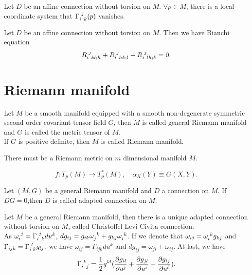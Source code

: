 \begin{newthem}
Let $D$ be an affine connection without torsion on $M$. $\forall p \in M$, there is a local coordinate system that $\tensor{\Gamma}{_i^j_k}(p)$ vanishes.
\end{newthem}

\begin{newthem}
Let $D$ be an affine connection without torsion on $M$. Then we have Bianchi equation
\[\tensor{R}{_i^j_{kl;h}} +  \tensor{R}{_i^j_{hk;l}} + \tensor{R}{_i^j_{lh;k}} = 0.\]
\end{newthem}

\section{Riemann manifold}
\begin{newdef} 
Let $M$ be a smooth manifold equipped with a smooth non-degenerate symmetric second order covariant tensor field $G$, then $M$ is called general Riemann manifold and $G$ is called the metric tensor of $M$.\\
If $G$ is positive definite, then $M$ is called Riemann manifold.
\end{newdef}

\vspace{15pt}

\begin{newthem}
There must be a Riemann metric on $m$ dimensional manifold $M$.
\end{newthem}

\vspace{15pt}

\begin{newdef}
\[f:T_p(M) \to T^*_p(M) , \quad \alpha_X(Y) \equiv G(X,Y).\]
\end{newdef}

\vspace{15pt}

\begin{newdef}
Let $(M,G)$ be a general Riemann manifold and $D$ a connection on $M$. If $DG=0$,then $D$ is called adapted connection on $M$.
\end{newdef}

\vspace{15pt}

\begin{newprop} 
Let $M$ be a general Riemann manifold, then there is a unique adapted connection without torsion on $M$, called Christoffel-Levi-Civita connection. \\
As $\tensor{\omega}{_i^j} = \tensor{\Gamma}{_i^j_k} du^k$, $dg_{ij} = g_{ik} \tensor{\omega}{_j^k}   + g_{kj}\tensor{\omega}{_i^k}$.
If we denote that $\omega_{ij} = \tensor{\omega}{_i^k}g_{kj}$ and $\Gamma_{ijk} =\tensor{\Gamma}{_i^l_k} g_{lj}$, we have $\omega_{ij}=\Gamma_{ijk}du^k$ and $dg_{ij} = \omega_{ji}+ \omega_{ij}$.
At last, we have
\[\tensor{\Gamma}{_i^k_j} = \frac{1}{2} g^{kl}(\frac{\partial g_{il}}{\partial u^j} + \frac{\partial g_{jl}}{\partial u^i} - \frac{\partial g_{ij}}{\partial u^l}).\]
\end{newprop}

